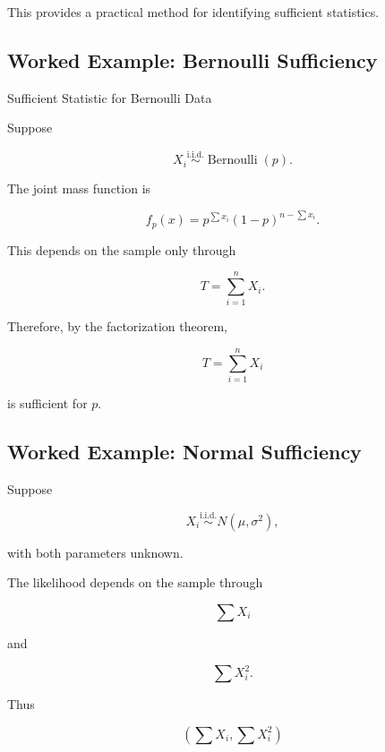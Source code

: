 This provides a practical method for identifying sufficient statistics.

\subsection{Worked Example: Bernoulli Sufficiency}
\label{subsec:worked-bernoulli-sufficiency}

\begin{workedexamplebox}{Sufficient Statistic for Bernoulli Data}

Suppose

\[
X_i
\overset{\text{i.i.d.}}{\sim}
\operatorname{Bernoulli}(p).
\]

The joint mass function is

\[
f_p(x)
=
p^{\sum x_i}
(1-p)^{n-\sum x_i}.
\]

This depends on the sample only through

\[
T
=
\sum_{i=1}^{n}X_i.
\]

Therefore, by the factorization theorem,

\begin{answerbox}
\[
\boxed{
T
=
\sum_{i=1}^{n}X_i
}
\]

is sufficient for \(p\).
\end{answerbox}

\end{workedexamplebox}

\subsection{Worked Example: Normal Sufficiency}
\label{subsec:worked-normal-sufficiency}

Suppose

\[
X_i
\overset{\text{i.i.d.}}{\sim}
N(\mu,\sigma^2),
\]

with both parameters unknown.

The likelihood depends on the sample through

\[
\sum X_i
\]

and

\[
\sum X_i^2.
\]

Thus

\[
\boxed{
\left(
\sum X_i,
\sum X_i^2
\right)
}
\]

